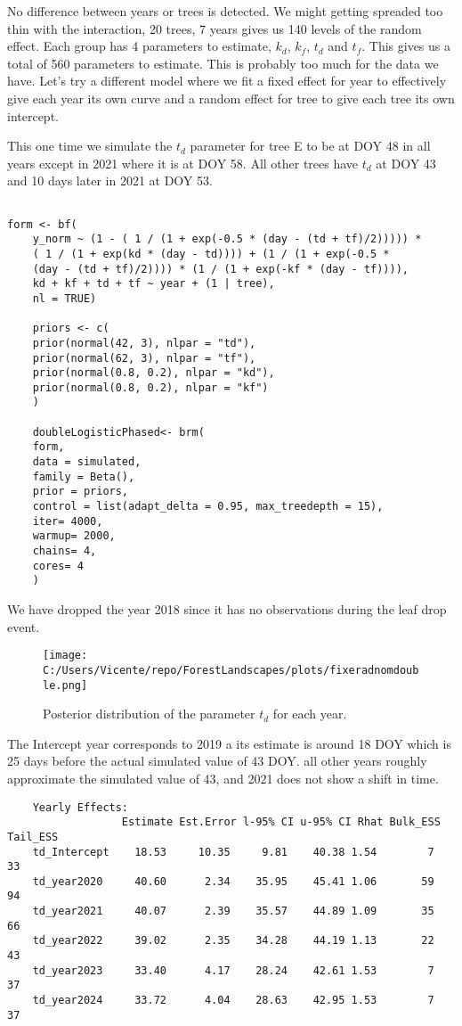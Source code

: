 \documentclass{article}
\begin{document}
No difference between years or trees is detected. We might getting spreaded too thin with the interaction, 20 trees, 7 years gives us 140 levels of the random effect. Each group has 4 parameters to estimate, $k_d$, $k_f$, $t_d$ and $t_f$.
This gives us a total of 560 parameters to estimate.
This is probably too much for the data we have.
Let's try a different model where we fit a fixed effect for year to effectively give each year its own curve and a random effect for tree to give each tree its own intercept.


This one time we simulate the $t_d$ parameter for tree E to be at DOY 48 in all years except in 2021 where it is at DOY 58.
All other trees have $t_d$ at DOY 43 and 10 days later in 2021 at DOY 53.

\begin{verbatim}
    
form <- bf(
    y_norm ~ (1 - ( 1 / (1 + exp(-0.5 * (day - (td + tf)/2))))) *
    ( 1 / (1 + exp(kd * (day - td)))) + (1 / (1 + exp(-0.5 *
    (day - (td + tf)/2)))) * (1 / (1 + exp(-kf * (day - tf)))),
    kd + kf + td + tf ~ year + (1 | tree),
    nl = TRUE)

    priors <- c(
    prior(normal(42, 3), nlpar = "td"),  
    prior(normal(62, 3), nlpar = "tf"),    
    prior(normal(0.8, 0.2), nlpar = "kd"),
    prior(normal(0.8, 0.2), nlpar = "kf")
    )

    doubleLogisticPhased<- brm(
    form,
    data = simulated,
    family = Beta(),
    prior = priors,
    control = list(adapt_delta = 0.95, max_treedepth = 15),
    iter= 4000,
    warmup= 2000,
    chains= 4,
    cores= 4
    )
\end{verbatim}

We have dropped the year 2018 since it has no observations during the leaf drop event.

\begin{figure}
    \centering
    \texttt{[image: C:/Users/Vicente/repo/ForestLandscapes/plots/fixeradnomdouble.png]}
    \caption{Posterior distribution of the parameter $t_d$ for each year.}
    \label{fig:td_posterior_treeE_year_fixed}
\end{figure}

The Intercept year corresponds to 2019 a its estimate is around 18 DOY which is 25 days before the actual simulated value of 43 DOY.
all other years roughly approximate the simulated value of 43, and 2021 does not show a shift in time. 
\begin{verbatim}
    Yearly Effects:
                  Estimate Est.Error l-95% CI u-95% CI Rhat Bulk_ESS Tail_ESS
    td_Intercept    18.53     10.35     9.81    40.38 1.54        7       33
    td_year2020     40.60      2.34    35.95    45.41 1.06       59       94
    td_year2021     40.07      2.39    35.57    44.89 1.09       35       66
    td_year2022     39.02      2.35    34.28    44.19 1.13       22       43
    td_year2023     33.40      4.17    28.24    42.61 1.53        7       37
    td_year2024     33.72      4.04    28.63    42.95 1.53        7       37
\end{verbatim}
\end{document}
